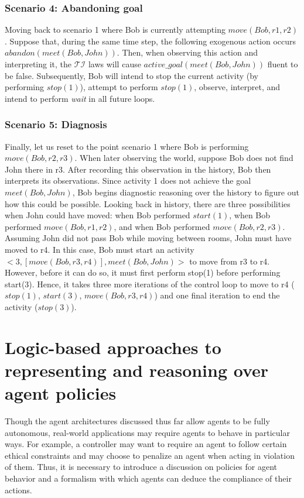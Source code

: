 \subsubsection{Scenario 4: Abandoning goal~\citep{blount_towards_2014}}
\label{subsubsec:aia_scenario_4}

Moving back to scenario 1 where Bob is currently attempting $move(Bob, r1, r2)$.
Suppose that, during the same time step, the following exogenous action occurs $abandon(meet(Bob, John))$.
Then, when observing this action and interpreting it, the $\mathcal{TI}$ laws will cause $active\_goal(meet(Bob, John))$ fluent to be false.
Subsequently, Bob will intend to stop the current activity (by performing $stop(1)$), attempt to perform $stop(1)$, observe, interpret, and intend to perform \textit{wait} in all future loops.

\subsubsection{Scenario 5: Diagnosis~\citep{blount_towards_2014}}
\label{subsubsec:aia_scenario_5}

Finally, let us reset to the point scenario 1 where Bob is performing $move(Bob, r2, r3)$.
When later observing the world, suppose Bob does not find John there in r3.
After recording this observation in the history, Bob then interprets its observations.
Since activity 1 does not achieve the goal $meet(Bob, John)$, Bob begins diagnostic reasoning over the history to figure out how this could be possible.
Looking back in history, there are three possibilities when John could have moved: when Bob performed $start(1)$, when Bob performed $move(Bob, r1, r2)$, and when Bob performed $move(Bob, r2, r3)$.
Assuming John did not pass Bob while moving between rooms, John must have moved to r4.
In this case, Bob must start an activity $<3, [move(Bob, r3, r4)],meet(Bob,John)>$ to move from r3 to r4.
However, before it can do so, it must first perform stop(1) before performing start(3).
Hence, it takes three more iterations of the control loop to move to r4 ($stop(1)$, $start(3)$, $move(Bob, r3,r4)$) and one final iteration to end the activity ($stop(3)$).

\section{Logic-based approaches to representing and reasoning over agent policies}
\label{sec:policies}

Though the agent architectures discussed thus far allow agents to be fully autonomous, real-world applications may require agents to behave in particular ways.
For example, a controller may want to require an agent to follow certain ethical constraints and may choose to penalize an agent when acting in violation of them.
Thus, it is necessary to introduce a discussion on policies for agent behavior and a formalism with which agents can deduce the compliance of their actions.


